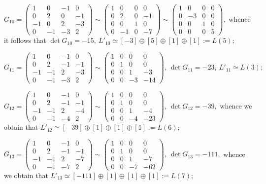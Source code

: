 \documentclass[14pt]{article}
\begin{document}
\begin{small}
$
G_{10} =
\begin{pmatrix}
1 & 0 & -1 & 0\\
0 & 2 & 0 & -1\\
-1 & 0 & 2 & -3\\
0 & -1 & -3 & 2
\end{pmatrix} \sim
\begin{pmatrix}
1 & 0 & 0 & 0\\
0 & 2 & 0 & -1\\
0 & 0 & 1 & 0\\
0 & -1 & 0 & -7
\end{pmatrix}\sim
\begin{pmatrix}
1 & 0 & 0 & 0\\
0 & -3 & 0 & 0\\
0 & 0 & 1 & 0\\
0 & 0 & 0 & 5
\end{pmatrix},
$
\vskip 0.4cm
whence it follows that
$\det G_{10} = -15, \ L'_{10} \simeq [-3] \oplus [5] \oplus [1]
\oplus [1]:=L(5);$
\vskip 0.4cm

$
G_{11} =
\begin{pmatrix}
1 & 0 & -1 & 0\\
0 & 2 & -1 & -1\\
-1 & -1 & 2 & -3\\
0 & -1 & -3 & 2
\end{pmatrix} \sim
\begin{pmatrix}
1 & 0 & 0 & 0\\
0 & 1 & 0 & 0\\
0 & 0 & 1 & -3\\
0 & 0 & -3 & -14
\end{pmatrix}, \ \det G_{11} = -23, \ L'_{11} \simeq L(3);
$

$
G_{12} =
\begin{pmatrix}
1 & 0 & -1 & 0\\
0 & 2 & -1 & -1\\
-1 & -1 & 2 & -4\\
0 & -1 & -4 & 2
\end{pmatrix} \sim
\begin{pmatrix}
1 & 0 & 0 & 0\\
0 & 1 & 0 & 0\\
0 & 0 & 1 & -4\\
0 & 0 & -4 & -23
\end{pmatrix}, \ \det G_{12} = -39,
$
\vskip 0.4cm
whence we obtain that $L'_{12} \simeq [-39] \oplus [1] \oplus [1]
\oplus [1]:= L(6);$
\vskip 0.4cm

$
G_{13} =
\begin{pmatrix}
1 & 0 & -1 & 0\\
0 & 2 & -1 & -1\\
-1 & -1 & 2 & -7\\
0 & -1 & -7 & 2
\end{pmatrix} \sim
\begin{pmatrix}
1 & 0 & 0 & 0\\
0 & 1 & 0 & 0\\
0 & 0 & 1 & -7\\
0 & 0 & -7 & -62
\end{pmatrix}, \ \det G_{13} = -111,
$
\vskip 0.4cm
whence we obtain that $L'_{13} \simeq [-111] \oplus [1] \oplus [1]
\oplus [1]:= L(7);$
\vskip 0.4cm


\end{small}
\end{document}

